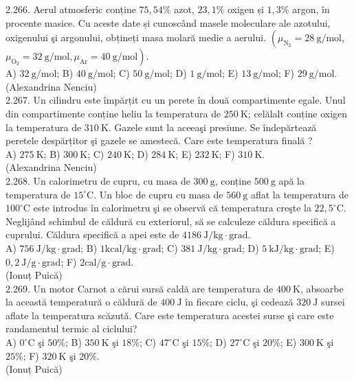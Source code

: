 2.266. Aerul atmosferic conține $75,54 \%$ azot, $23,1 \%$ oxigen și $1,3 \%$ argon, în procente masice. Cu aceste date și cunoscând masele moleculare ale azotului, oxigenului şi argonului, obțineți masa molară medie a aerului. $\left(\mu_{\mathrm{N}_{2}}=28 \mathrm{~g} / \mathrm{mol}\right.$, $\left.\mu_{\mathrm{O}_{2}}=32 \mathrm{~g} / \mathrm{mol}, \mu_{\mathrm{Ar}}=40 \mathrm{~g} / \mathrm{mol}\right)$.\\ A) $32 \mathrm{~g} / \mathrm{mol}$; B) $40 \mathrm{~g} / \mathrm{mol}$; C) $50 \mathrm{~g} / \mathrm{mol}$; D) $1 \mathrm{~g} / \mathrm{mol}$; E) $13 \mathrm{~g} / \mathrm{mol}$; F) $29 \mathrm{~g} / \mathrm{mol}$.\\ (Alexandrina Nenciu)\\

2.267. Un cilindru este împărțit cu un perete în două compartimente egale. Unul din compartimente conține heliu la temperatura de $250 \mathrm{~K}$; celălalt conține oxigen la temperatura de $310 \mathrm{~K}$. Gazele sunt la aceeaşi presiune. Se îndepărtează peretele despărțitor şi gazele se amestecă. Care este temperatura finală ?\\ A) $275 \mathrm{~K}$; B) $300 \mathrm{~K}$; C) $240 \mathrm{~K}$; D) $284 \mathrm{~K}$; E) $232 \mathrm{~K}$; F) $310 \mathrm{~K}$.\\ (Alexandrina Nenciu)\\

2.268. Un calorimetru de cupru, cu masa de $300 \mathrm{~g}$, conține $500 \mathrm{~g}$ apă la temperatura de $15^{\circ} \mathrm{C}$. Un bloc de cupru cu masa de $560 \mathrm{~g}$ aflat la temperatura de $100^{\circ} \mathrm{C}$ este introdus în calorimetru şi se observă că temperatura creşte la $22,5^{\circ} \mathrm{C}$. Neglijând schimbul de căldură cu exteriorul, să se calculeze căldura specifică a cuprului. Căldura specifică a apei este de $4186 \mathrm{~J} / \mathrm{kg} \cdot \mathrm{grad}$.\\ A) $756 \mathrm{~J} / \mathrm{kg} \cdot \mathrm{grad}$; B) $1 \mathrm{kcal} / \mathrm{kg} \cdot \mathrm{grad}$; C) $381 \mathrm{~J} / \mathrm{kg} \cdot \mathrm{grad}$; D) $5 \mathrm{~kJ} / \mathrm{kg} \cdot \mathrm{grad}$; E) $0,2 \mathrm{~J} / \mathrm{g} \cdot \mathrm{grad}$; F) $2 \mathrm{cal} / \mathrm{g} \cdot \mathrm{grad}$.\\ (Ionuț Puică)\\

2.269. Un motor Carnot a cărui sursă caldă are temperatura de $400 \mathrm{~K}$, absoarbe la această temperatură o căldură de $400 \mathrm{~J}$ în fiecare ciclu, şi cedează $320 \mathrm{~J}$ sursei aflate la temperatura scăzută. Care este temperatura acestei surse şi care este randamentul termic al ciclului?\\ A) $0^{\circ} \mathrm{C}$ şi $50 \%$; B) $350 \mathrm{~K}$ şi $18 \%$; C) $47^{\circ} \mathrm{C}$ şi $15 \%$; D) $27^{\circ} \mathrm{C}$ şi $20 \%$; E) $300 \mathrm{~K}$ şi $25 \%$; F) $320 \mathrm{~K}$ şi $20 \%$.\\ (Ionuț Puică)\\

